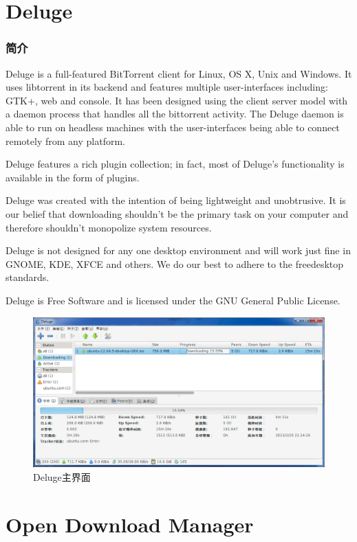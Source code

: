 \documentclass[paper=a4,fontsize=11pt]{article}
\begin{document}
	\section{Deluge}
	\subsubsection{简介}
	Deluge is a full-featured ​BitTorrent client for Linux, OS X, Unix and Windows. It uses ​libtorrent in its backend and features multiple user-interfaces including: GTK+, web and console. It has been designed using the client server model with a daemon process that handles all the bittorrent activity. The Deluge daemon is able to run on headless machines with the user-interfaces being able to connect remotely from any platform.
	
	Deluge features a rich plugin collection; in fact, most of Deluge's functionality is available in the form of plugins.
	
	Deluge was created with the intention of being lightweight and unobtrusive. It is our belief that downloading shouldn't be the primary task on your computer and therefore shouldn't monopolize system resources.
	
	Deluge is not designed for any one desktop environment and will work just fine in GNOME, KDE, XFCE and others. We do our best to adhere to the ​freedesktop standards.
	
	Deluge is ​Free Software and is licensed under the ​GNU General Public License.
	
	
	\begin{figure}[htbp]
		\centering
		\includegraphics[scale=0.35]{DelugeWindowsUI.jpg}
		\caption{Deluge主界面}
		\label{DelugeWindowsUI}
	\end{figure}
	
	\section{Open Download Manager}
	
\end{document}
